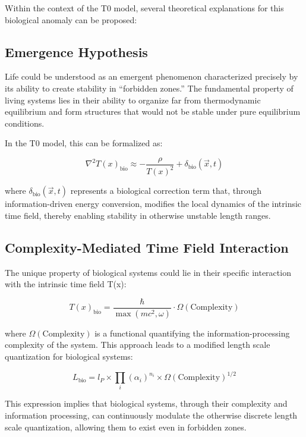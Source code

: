 \documentclass[12pt,a4paper]{article}
\newcommand{\Tfield}{T(x)}
\begin{document}
	Within the context of the T0 model, several theoretical explanations for this biological anomaly can be proposed:
	
	\subsection{Emergence Hypothesis}
	
	Life could be understood as an emergent phenomenon characterized precisely by its ability to create stability in ``forbidden zones.'' The fundamental property of living systems lies in their ability to organize far from thermodynamic equilibrium and form structures that would not be stable under pure equilibrium conditions.
	
	In the T0 model, this can be formalized as:
	
	\begin{equation}
		\nabla^2\Tfield_{\text{bio}} \approx -\frac{\rho}{\Tfield^2} + \delta_{\text{bio}}(\vec{x}, t)
	\end{equation}
	
	where $\delta_{\text{bio}}(\vec{x}, t)$ represents a biological correction term that, through information-driven energy conversion, modifies the local dynamics of the intrinsic time field, thereby enabling stability in otherwise unstable length ranges.
	
	\subsection{Complexity-Mediated Time Field Interaction}
	
	The unique property of biological systems could lie in their specific interaction with the intrinsic time field \Tfield:
	
	\begin{equation}
		\Tfield_{\text{bio}} = \frac{\hbar}{\max(mc^2, \omega)} \cdot \Omega(\text{Complexity})
	\end{equation}
	
	where $\Omega(\text{Complexity})$ is a functional quantifying the information-processing complexity of the system. This approach leads to a modified length scale quantization for biological systems:
	
	\begin{equation}
		L_{\text{bio}} = l_P \times \prod_{i} (\alpha_i)^{n_i} \times \Omega(\text{Complexity})^{1/2}
	\end{equation}
	
	This expression implies that biological systems, through their complexity and information processing, can continuously modulate the otherwise discrete length scale quantization, allowing them to exist even in forbidden zones.
	
\end{document}
